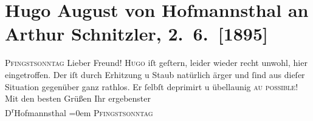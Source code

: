 

         
         \renewcommand{\erwaehntePersonen}{Personen: Hugo August von Hofmannsthal, Hugo von Hofmannsthal}
         \renewcommand{\erwaehnteInstitutionen}{Institutionen: Allgemeine Bodencreditanstalt}
         \renewcommand{\erwaehnteOrte}{Orte: Wien}
         \renewcommand{\erwaehnteWerke}{}
               \section[Hugo August von Hofmannsthal an Arthur Schnitzler, 2. 6. {[}1895{]}]{ Hugo August von Hofmannsthal an Arthur Schnitzler, 2. 6. {[}1895{]}}\nopagebreak{}\rehead{ }\begin{ledgroupsized}[t]{13cm}\normalsize\beginnumbering{} \toendnotes[C]{\smallbreak\pagebreak[2]} 
\toendnotes[C]{\smallbreak}\pstart
           \noindent{}\label{T_L00448-1v}\label{T_L00448-1h}\pend
           \pstart
           \raggedleft{}\textsc{Pfingstsonntag}\pend
           \pstart{}Lieber Freund!\pend\pstart
           \textsc{Hugo} iſt geſtern, leider wieder recht unwohl, hier eingetroffen. Der \label{T_L00448-2v}\label{T_L00448-2h} iſt durch
               Erhitzung u Staub natürlich ärger und ſind aus dieſer Situation gegenüber ganz
               rathlos. Er ſelbſt deprimirt u übellaunig \textsc{au poſsible}!\pend
           \pstart
           Mit den besten Grüßen Ihr ergebenster{\\[\baselineskip]}\spacefill\mbox{D\textsuperscript{r}Hofmannsthal}\pend
           \leftskip=0em{}\pstart
           \textsc{Pfingstsonntag}\pend
           
         
         \endnumbering{}\end{ledgroupsized}  \newcommand{\dateiname}{L00448}\newcommand{\titel}{Hugo August von Hofmannsthal an Arthur Schnitzler, 2. 6. [1895]}\newcommand{\editorInnen}{Martin Anton Müller und Gerd-Hermann Susen}
      